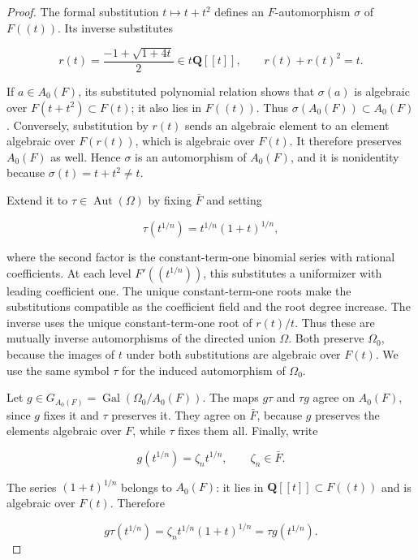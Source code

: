 \begin{proof}
The formal substitution \(t\mapsto t+t^2\) defines an \(F\)-automorphism \(\sigma\) of \(F((t))\). Its inverse substitutes

\[
                r(t)=\frac{-1+\sqrt{1+4t}}2\in t\mathbf Q[[t]],
                 \qquad r(t)+r(t)^2=t.
 \tag{F.47.10}
\]

If \(a\in A_0(F)\), its substituted polynomial relation shows that \(\sigma(a)\) is algebraic over \(F(t+t^2)\subset F(t)\); it also lies in \(F((t))\). Thus \(\sigma(A_0(F))\subset A_0(F)\). Conversely, substitution by \(r(t)\) sends an algebraic element to an element algebraic over \(F(r(t))\), which is algebraic over \(F(t)\). It therefore preserves \(A_0(F)\) as well. Hence \(\sigma\) is an automorphism of \(A_0(F)\), and it is nonidentity because \(\sigma(t)=t+t^2\ne t\).

Extend it to \(\tau\in\operatorname{Aut}(\Omega)\) by fixing \(\bar F\) and setting

\[
              \tau(t^{1/n})=t^{1/n}(1+t)^{1/n},
 \tag{F.47.11}
\]

where the second factor is the constant-term-one binomial series with rational coefficients. At each level \(F'((t^{1/n}))\), this substitutes a uniformizer with leading coefficient one. The unique constant-term-one roots make the substitutions compatible as the coefficient field and the root degree increase. The inverse uses the unique constant-term-one root of \(r(t)/t\). Thus these are mutually inverse automorphisms of the directed union \(\Omega\). Both preserve \(\Omega_0\), because the images of \(t\) under both substitutions are algebraic over \(F(t)\). We use the same symbol \(\tau\) for the induced automorphism of \(\Omega_0\).

Let \(g\in G_{A_0(F)}=\operatorname{Gal}(\Omega_0/A_0(F))\). The maps \(g\tau\) and \(\tau g\) agree on \(A_0(F)\), since \(g\) fixes it and \(\tau\) preserves it. They agree on \(\bar F\), because \(g\) preserves the elements algebraic over \(F\), while \(\tau\) fixes them all. Finally, write

\[
                    g(t^{1/n})=\zeta_n t^{1/n},
                        \qquad\zeta_n\in\bar F.
\]

The series \((1+t)^{1/n}\) belongs to \(A_0(F)\): it lies in \(\mathbf Q[[t]]\subset F((t))\) and is algebraic over \(F(t)\). Therefore

\[
 g\tau(t^{1/n})
   =\zeta_n t^{1/n}(1+t)^{1/n}
   =\tau g(t^{1/n}).
 \tag{F.47.12}
\]


\end{proof}
